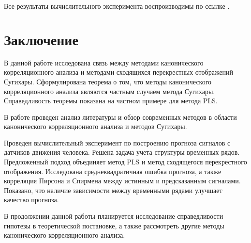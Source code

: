 \documentclass[12pt]{extarticle}
\begin{document}
Все результаты вычислительного эксперимента воспроизводимы по ссылке \cite{code}.


\section{Заключение}

В данной работе исследована связь между методами канонического корреляционного анализа и методами сходящихся перекрестных отображений Сугихары. Сформулирована теорема о том, что методы канонического корреляционного анализа являются частным случаем метода Сугихары. Справедливость теоремы показана на частном примере для метода PLS. 

В работе проведен анализ литературы и обзор современных методов в области канонического корреляционного анализа и методов Сугихары.

Проведен вычислительный эксперимент по построению прогноза сигналов с датчиков движения человека. Решена задача учета структуры временных рядов. Предложенный подход объединяет метод PLS и метод сходящегося перекрестного отображения. Исследована среднеквадратичная ошибка прогноза, а также корреляция Пирсона и Спирмена между истинным и предсказанным сигналами. Показано, что наличие зависимости между временными рядами улучшает качество прогноза. 

В продолжении данной работы планируется исследование справедливости гипотезы в теоретической постановке, а также рассмотреть другие методы канонического корреляционного анализа.




\nocite{*}
\newpage
\end{document}
